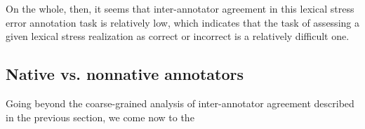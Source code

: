 		
	
		
		 On the whole, then, it seems that inter-annotator agreement in this lexical stress error annotation task is relatively low, which indicates that the task of assessing a given lexical stress realization as correct or incorrect is a relatively difficult one. 
	
	
		\subsection{Native vs. nonnative annotators}
		\label{sec:agreement:native}
		
		
		
		
		Going beyond the coarse-grained analysis of inter-annotator agreement described in the previous section, we come now to the 
		
		
